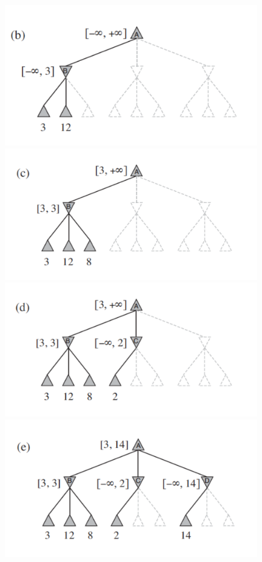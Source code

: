 \documentclass{article}
\begin{document}
\begin{figure}[h!]
\centering
\includegraphics[scale=0.25]{Images/alfabetaaction1.png}
\includegraphics[scale=0.25]{Images/alfabetaaction2.png}
\includegraphics[scale=0.25]{Images/alfabetaaction3.png}
\includegraphics[scale=0.25]{Images/alfabetaaction4.png}

\end{figure}
\end{document}
